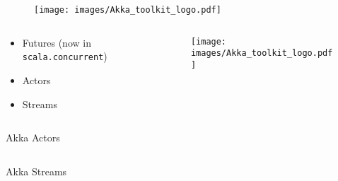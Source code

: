 \documentclass[aspectratio=169]{beamer}
\begin{document}
\begin{frame}
  \begin{figure}
    \texttt{[image: images/Akka\_toolkit\_logo.pdf]}
  \end{figure}
\end{frame}

\begin{frame}
  \begin{columns}[c]
    \begin{column}{0.5\textwidth}
      \begin{itemize}
      \item Futures (now in \texttt{scala.concurrent})
      \item Actors
      \item Streams
      \end{itemize}
    \end{column}

    \begin{column}{0.5\textwidth}
      \begin{figure}
        \texttt{[image: images/Akka\_toolkit\_logo.pdf]}
      \end{figure}
    \end{column}
  \end{columns}
\end{frame}

\begin{frame}[fragile]{Akka Actors}
  \inputminted{scala}{snippets/actors.scala}
\end{frame}

\begin{frame}[fragile]{Akka Streams}
  \inputminted{scala}{snippets/streams.scala}
\end{frame}
\end{document}
